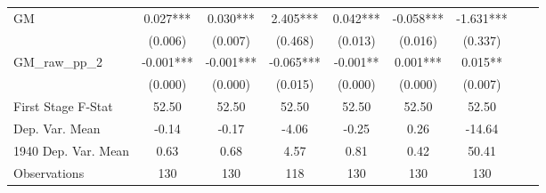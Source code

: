 \begin{tabular}{l*{8}{c}}
GM              &    0.027***&    0.030***&    2.405***&    0.042***&   -0.058***&   -1.631***\\
                &  (0.006)   &  (0.007)   &  (0.468)   &  (0.013)   &  (0.016)   &  (0.337)   \\
\addlinespace
GM\_raw\_pp\_2     &   -0.001***&   -0.001***&   -0.065***&   -0.001** &    0.001***&    0.015** \\
                &  (0.000)   &  (0.000)   &  (0.015)   &  (0.000)   &  (0.000)   &  (0.007)   \\
\midrule
First Stage F-Stat&    52.50   &    52.50   &    52.50   &    52.50   &    52.50   &    52.50   \\
Dep. Var. Mean  &    -0.14   &    -0.17   &    -4.06   &    -0.25   &     0.26   &   -14.64   \\
1940 Dep. Var. Mean&     0.63   &     0.68   &     4.57   &     0.81   &     0.42   &    50.41   \\
Observations    &      130   &      130   &      118   &      130   &      130   &      130   \\
       \bottomrule \end{tabular}
